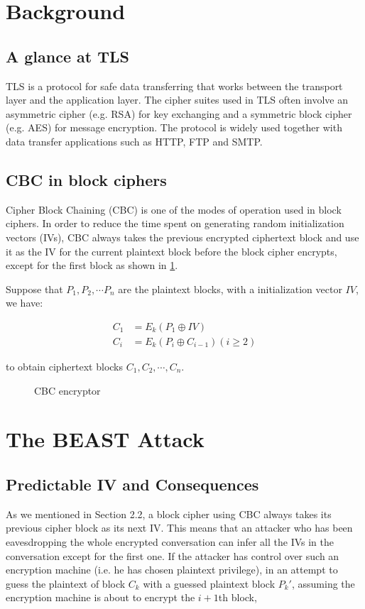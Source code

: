 \documentclass{acm_proc_article-sp}
\begin{document}
\section{Background}
\subsection{A glance at TLS}

TLS is a protocol for safe data transferring that works between the transport layer
and the application layer. The cipher suites used in TLS often involve an asymmetric cipher
(e.g. RSA) for key exchanging and a symmetric block cipher (e.g. AES) for message encryption.
The protocol is widely used together with data transfer applications such as HTTP, FTP and SMTP.

\subsection{CBC in block ciphers}
Cipher Block Chaining (CBC) is one of the modes of operation used in block ciphers.
In order to reduce the time spent on generating random initialization vectors (IVs), CBC always takes
the previous encrypted ciphertext block and use it as the IV for the current plaintext block before the
block cipher encrypts, except for the first block as shown in \ref{fig:cbc-encryptor}.

Suppose that $P_1,P_2,\cdots P_n$ are the plaintext blocks, with a initialization vector $IV$, we have:

$$
\begin{aligned}
C_1&=E_k(P_1\oplus IV)\\
C_i&=E_k(P_{i}\oplus C_{i-1}) (i\geq 2)
\end{aligned}
$$

to obtain ciphertext blocks $C_1,C_2,\cdots,C_n$.

\begin{figure}[htb]
  \centering
  
  \caption{CBC encryptor}
  \label{fig:cbc-encryptor}
\end{figure}

\section{The BEAST Attack}
\subsection{Predictable IV and Consequences}
As we mentioned in Section 2.2, a block cipher using CBC always takes its previous cipher block as
its next IV. This means that an attacker who has been eavesdropping the whole encrypted
conversation can infer all the IVs in the conversation except for the first one.
If the attacker has control over such an encryption machine (i.e. he has chosen plaintext privilege),
in an attempt to guess the plaintext of block $C_k$ with a guessed plaintext block $P_k'$,
assuming the encryption machine is about to encrypt the $i+1$th block,
\end{document}
